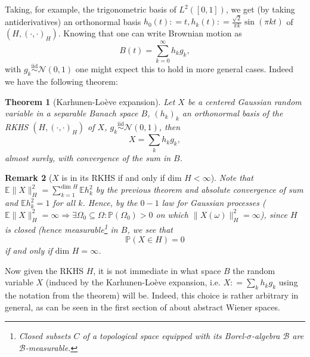 \documentclass[11pt,reqno]{amsart}
\numberwithin{equation}{section}
\newtheorem{thm}{Theorem}[section]
\newtheorem{rem}[thm]{Remark}
\newcommand{\deq}{\mathrel{\mathop:}=}
\newcommand{\iidnormal}{\mathrel{\stackrel{\text{iid}}{\sim}}\mathcal N(0,1)}
\begin{document}
Taking, for example, the trigonometric basis of $L^2([0,1])$, we get (by taking antiderivatives) an orthonormal basis $h_0(t)\deq t, h_k(t)\deq \frac{\sqrt 2}{\pi k}\sin(\pi kt)$ of $(H,(\cdot,\cdot)_H)$. Knowing that one can write Brownian motion as $$B(t)=\sum_{k=0}^\infty h_kg_k,$$ with $g_k\iidnormal$ one might expect this to hold in more general cases.
Indeed we have the following theorem:

\begin{thm}[Karhunen-Lo\`eve expansion]
	Let $X$ be a centered Gaussian random variable in a separable Banach space $B$, $(h_k)_k$ an orthonormal basis of the RKHS $(H,(\cdot,\cdot)_H)$ of $X$, $g_k\iidnormal$, then
	$$X=\sum_k h_kg_k,$$
	almost surely, with convergence of the sum in $B$.
\end{thm}

\begin{rem}[$X$ is in its RKHS if and only if dim $H<\infty$]\label{rem:XnotinRKHS}
	Note that $\mathbb E\|X\|_H^2 = \sum_{k=1}^{\text{dim }H}\mathbb E h_k^2$ by the previous theorem and absolute convergence of sum and $\mathbb E h_k^2 = 1$ for all $k$. Hence, by the $0-1$ law for Gaussian processes ($\mathbb E\|X\|_H^2=\infty \Rightarrow \exists\Omega_0\subseteq\Omega: \mathbb P(\Omega_0)>0$ on which $\|X(\omega)\|_H^2=\infty$), since $H$ is closed (hence measurable\footnote{Closed subsets $C$ of a topological space equipped with its Borel-$\sigma$-algebra $\mathcal B$ are $\mathcal B$-measurable.} in $B$, we see that $$\mathbb P(X\in H)=0$$
	if and only if $\text{dim }H=\infty$.
\end{rem}

Now given the RKHS $H$, it is not immediate in what space $B$ the random variable $X$ (induced by the Karhunen-Lo\`eve expansion, i.e. $X\deq \sum_k h_kg_k$ using the notation from the theorem) will be. Indeed, this choice is rather arbitrary in general, as can be seen in the first section of \cite{She07} about abstract Wiener spaces.
\end{document}
